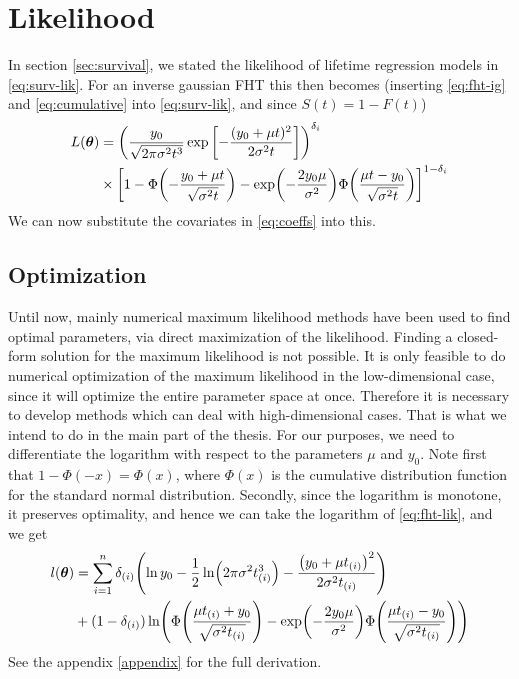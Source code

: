 \section{Likelihood}\label{sec:lik}
In section \ref{sec:survival}, we stated the likelihood of lifetime regression models in \eqref{eq:surv-lik}. For an inverse gaussian FHT this then becomes (inserting \eqref{eq:fht-ig} and \eqref{eq:cumulative} into \eqref{eq:surv-lik}, and since $S(t)=1-F(t)$)
\begin{align}\label{eq:fht-lik}
\begin{split}
L(\btheta)&=\p*{\frac{y_0}{\sqrt{2\pi\sigma^2t^3}}\exp\left[-\frac{(y_0+\mu t)^2}{2\sigma^2t}\right]}^{\delta_i}\\
&\times\sqb*{1-\Phi\p*{-\frac{y_0+\mu t}{\sqrt{\sigma^2t}}}-\exp\p*{-\frac{2y_0\mu}{\sigma^2}}\Phi\p*{\frac{\mu t-y_0}{\sqrt{\sigma^2t}}}}^{1-\delta_i}
\end{split}
\end{align}
We can now substitute the covariates in \eqref{eq:coeffs} into this.

\subsection{Optimization}
Until now, mainly numerical maximum likelihood methods have been used to find optimal parameters, via direct maximization of the likelihood. Finding a closed-form solution for the maximum likelihood is not possible. It is only feasible to do numerical optimization of the maximum likelihood in the low-dimensional case, since it will optimize the entire parameter space at once. Therefore it is necessary to develop methods which can deal with high-dimensional cases. That is what we intend to do in the main part of the thesis. For our purposes, we need to differentiate the logarithm with respect to the parameters $\mu$ and $y_0$. Note first that $1-\Phi(-x)=\Phi(x)$, where $\Phi(x)$ is the cumulative distribution function for the standard normal distribution. Secondly, since the logarithm is monotone, it preserves optimality, and hence we can take the logarithm of \eqref{eq:fht-lik}, and we get
\begin{align}\label{eq:loglik}
\begin{split}
    l(\btheta)&=\sum_{i=1}^n\di\p*{\ln y_0-\frac{1}{2}\ln\p*{2\pi\sigma^2\ti^3}-\frac{\p*{y_0+\mu\ti}^2}{2\sigma^2\ti}} \\
    &+
    (1-\di)\ln\p*{\Phi\p*{\frac{\mu\ti+y_0}{\sqrt{\sigma^2\ti}}}-\exp\p*{-\frac{2y_0\mu}{\sigma^2}}\Phi\p*{\frac{\mu\ti-y_0}{\sqrt{\sigma^2\ti}}}}
\end{split}
\end{align}
See the appendix \ref{appendix} for the full derivation.